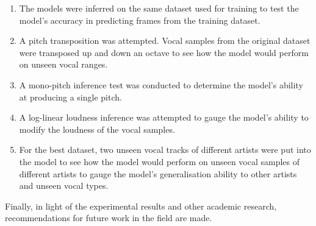 \begin{enumerate}
    \item The models were inferred on the same dataset used for training to test the model's accuracy in predicting frames from the training dataset.
    \item A pitch transposition was attempted. Vocal samples from the original dataset were transposed up and down an octave to see how the model would perform on unseen vocal ranges.
    \item A mono-pitch inference test was conducted to determine the model's ability at producing a single pitch.
    \item A log-linear loudness inference was attempted to gauge the model's ability to modify the loudness of the vocal samples.
    \item For the best dataset, two unseen vocal tracks of different artists were put into the model to see how the model would perform on unseen vocal samples of different artists to gauge the model's generalisation ability to other artists and unseen vocal types.
\end{enumerate}

Finally, in light of the experimental results and other academic research, recommendations for future work in the field are made.